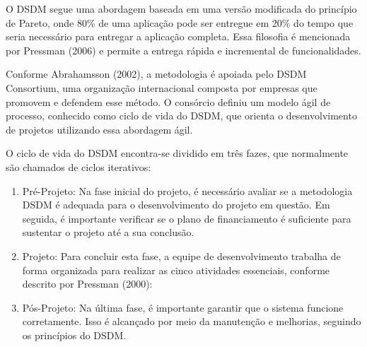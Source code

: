 O DSDM segue uma abordagem baseada em uma versão modificada do princípio de Pareto, onde 80\% de uma aplicação pode ser entregue em 20\% do tempo que seria necessário para entregar a aplicação completa. Essa filosofia é mencionada por Pressman (2006) e permite a entrega rápida e incremental de funcionalidades.

Conforme Abrahamsson (2002), a metodologia é apoiada pelo DSDM Consortium, uma organização internacional composta por empresas que promovem e defendem esse método. O consórcio definiu um modelo ágil de processo, conhecido como ciclo de vida do DSDM, que orienta o desenvolvimento de projetos utilizando essa abordagem ágil.

O ciclo de vida do DSDM encontra-se dividido em três fazes, que normalmente são chamados de ciclos iterativos:

\begin{enumerate}
	\item Pré-Projeto: Na fase inicial do projeto, é necessário avaliar se a metodologia DSDM é adequada para o desenvolvimento do projeto em questão. Em seguida, é importante verificar se o plano de financiamento é suficiente para sustentar o projeto até a sua conclusão.
	\item Projeto: Para concluir esta fase, a equipe de desenvolvimento trabalha de forma organizada para realizar as cinco atividades essenciais, conforme descrito por Pressman (2000):
	\item Pós-Projeto: Na última fase, é importante garantir que o sistema funcione corretamente. Isso é alcançado por meio da manutenção e melhorias, seguindo os princípios do DSDM.
\end{enumerate}

